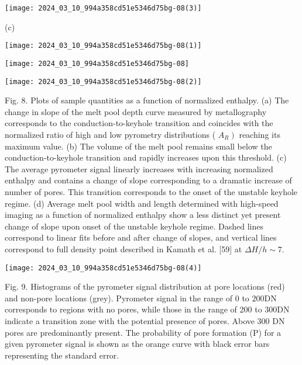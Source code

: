 \documentclass[10pt]{article}
\begin{document}
\begin{center}
\texttt{[image: 2024\_03\_10\_994a358cd51e5346d75bg-08(3)]}
\end{center}

(c)

\begin{center}
\texttt{[image: 2024\_03\_10\_994a358cd51e5346d75bg-08(1)]}
\end{center}

\begin{center}
\texttt{[image: 2024\_03\_10\_994a358cd51e5346d75bg-08]}
\end{center}

\begin{center}
\texttt{[image: 2024\_03\_10\_994a358cd51e5346d75bg-08(2)]}
\end{center}

Fig. 8. Plots of sample quantities as a function of normalized enthalpy. (a) The change in slope of the melt pool depth curve measured by metallography corresponds to the conduction-to-keyhole transition and coincides with the normalized ratio of high and low pyrometry distributions ( $\left.A_{R}\right)$ reaching its maximum value. (b) The volume of the melt pool remains small below the conduction-to-keyhole transition and rapidly increases upon this threshold. (c) The average pyrometer signal linearly increases with increasing normalized enthalpy and contains a change of slope corresponding to a dramatic increase of number of pores. This transition corresponds to the onset of the unstable keyhole regime. (d) Average melt pool width and length determined with high-speed imaging as a function of normalized enthalpy show a less distinct yet present change of slope upon onset of the unstable keyhole regime. Dashed lines correspond to linear fits before and after change of slopes, and vertical lines correspond to full density point described in Kamath et al. [59] at $\Delta H / h \sim 7$.

\begin{center}
\texttt{[image: 2024\_03\_10\_994a358cd51e5346d75bg-08(4)]}
\end{center}

Fig. 9. Histograms of the pyrometer signal distribution at pore locations (red) and non-pore locations (grey). Pyrometer signal in the range of 0 to $200 \mathrm{DN}$ corresponds to regions with no pores, while those in the range of 200 to $300 \mathrm{DN}$ indicate a transition zone with the potential presence of pores. Above 300 DN pores are predominantly present. The probability of pore formation (P) for a given pyrometer signal is shown as the orange curve with black error bars representing the standard error.
\end{document}
